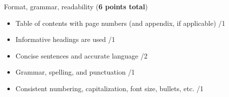 \documentclass{article}
\begin{document}
Format, grammar, readability (\textbf{6 points total})
\begin{small}
\begin{itemize}
	\item Table of contents with page numbers (and appendix, if applicable) \hfill \underline{\hspace{1cm}}/1
	\item Informative headings are used \hfill \underline{\hspace{1cm}}/1
	\item Concise sentences and accurate language \hfill \underline{\hspace{1cm}}/2
	\item Grammar, spelling, and punctuation \hfill \underline{\hspace{1cm}}/1
	\item Consistent numbering, capitalization, font size, bullets, etc. \hfill \underline{\hspace{1cm}}/1
\end{itemize}
\end{small}\
\end{document}

